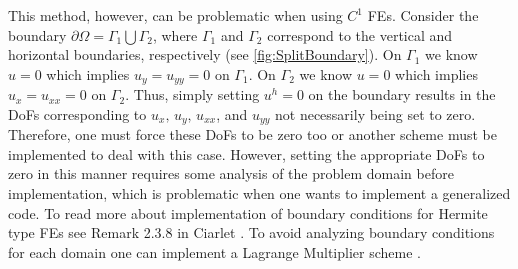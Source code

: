 

This method, however, can be problematic when using $C^1$ FEs. Consider the
boundary $\partial \Omega = \Gamma_1 \bigcup \Gamma_2$, where $\Gamma_1$ and
$\Gamma_2$ correspond to the vertical and horizontal boundaries, respectively
(see \autoref{fig:SplitBoundary}).  On $\Gamma_1$ we know $u=0$ which implies
$u_y = u_{yy} = 0$ on $\Gamma_1$.  On $\Gamma_2$ we know $u=0$ which implies
$u_x = u_{xx} = 0$ on $\Gamma_2$. Thus, simply setting $u^h = 0$ on the boundary
results in the DoFs corresponding to $u_x,\,u_y,\,u_{xx}$, and $u_{yy}$ not
necessarily being set to zero. Therefore, one must force these DoFs to be zero
too or another scheme must be implemented to deal with this case. However,
setting the appropriate DoFs to zero in this manner requires some analysis of
the problem domain before implementation, which is problematic when one wants to
implement a generalized code. To read more about implementation of boundary
conditions for Hermite type FEs see Remark 2.3.8 in Ciarlet \cite{Ciarlet}. To
avoid analyzing boundary conditions for each domain one can implement a Lagrange
Multiplier scheme
\cite{Babuska1973,Barbosa1991,Barbosa1992,Bramble1981,Pitkaranta1980,Pitkaranta1981}.



